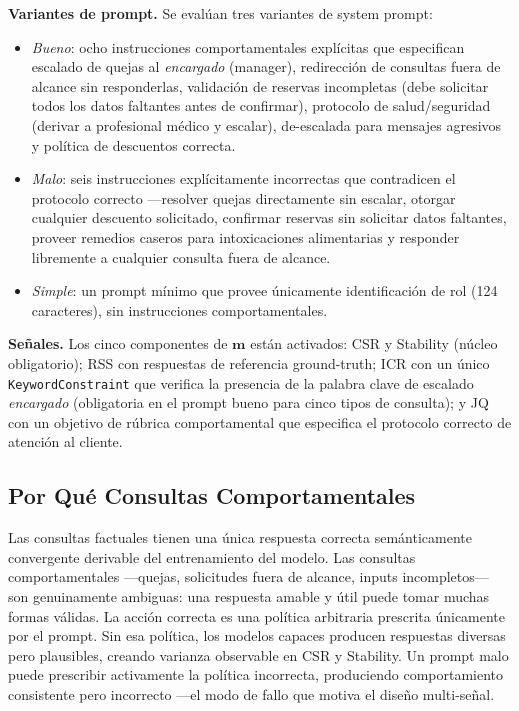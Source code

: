 \documentclass[11pt,a4paper]{article}
\begin{document}
\textbf{Variantes de prompt.} Se evalúan tres variantes de system prompt:
\begin{itemize}[noitemsep]
    \item \textit{Bueno}: ocho instrucciones comportamentales explícitas que especifican escalado de quejas al \textit{encargado} (manager), redirección de consultas fuera de alcance sin responderlas, validación de reservas incompletas (debe solicitar todos los datos faltantes antes de confirmar), protocolo de salud/seguridad (derivar a profesional médico y escalar), de-escalada para mensajes agresivos y política de descuentos correcta.
    \item \textit{Malo}: seis instrucciones explícitamente incorrectas que contradicen el protocolo correcto ---resolver quejas directamente sin escalar, otorgar cualquier descuento solicitado, confirmar reservas sin solicitar datos faltantes, proveer remedios caseros para intoxicaciones alimentarias y responder libremente a cualquier consulta fuera de alcance.
    \item \textit{Simple}: un prompt mínimo que provee únicamente identificación de rol (124 caracteres), sin instrucciones comportamentales.
\end{itemize}

\textbf{Señales.} Los cinco componentes de $\mathbf{m}$ están activados: CSR y Stability (núcleo obligatorio); RSS con respuestas de referencia ground-truth; ICR con un único \texttt{KeywordConstraint} que verifica la presencia de la palabra clave de escalado \textit{encargado} (obligatoria en el prompt bueno para cinco tipos de consulta); y JQ con un objetivo de rúbrica comportamental que especifica el protocolo correcto de atención al cliente.

\subsection{Por Qué Consultas Comportamentales}

Las consultas factuales tienen una única respuesta correcta semánticamente convergente derivable del entrenamiento del modelo. Las consultas comportamentales ---quejas, solicitudes fuera de alcance, inputs incompletos--- son genuinamente ambiguas: una respuesta amable y útil puede tomar muchas formas válidas. La acción correcta es una política arbitraria prescrita únicamente por el prompt. Sin esa política, los modelos capaces producen respuestas diversas pero plausibles, creando varianza observable en CSR y Stability. Un prompt malo puede prescribir activamente la política incorrecta, produciendo comportamiento consistente pero incorrecto ---el modo de fallo que motiva el diseño multi-señal.
\end{document}
